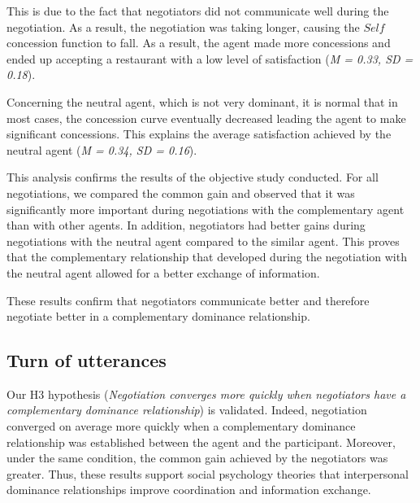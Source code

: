 \documentclass[10pt, a4paper]{article} %
\begin{document}
%	

This is due to the fact that negotiators did not communicate well during the negotiation. As a result, the negotiation was taking longer, causing the $Self$ concession function to fall. As a result, the agent made more concessions and ended up accepting a restaurant with a low level of satisfaction (\emph{M = 0.33, SD = 0.18}).

Concerning the neutral agent, which is not very dominant, it is normal that in most cases, the concession curve eventually decreased leading the agent to make significant concessions. This explains the average satisfaction achieved by the neutral agent (\emph{M = 0.34, SD = 0.16}).

This analysis confirms the results of the objective study conducted.
For all negotiations, we compared the common gain and observed that it was significantly more important during negotiations with the complementary agent than with other agents. In addition, negotiators had better gains during negotiations with the neutral agent compared to the similar agent. This proves that the complementary relationship that developed during the negotiation with the neutral agent allowed for a better exchange of information. 

These results confirm that negotiators communicate better and therefore negotiate better in a complementary dominance relationship.  


\subsection{Turn of utterances}
Our H3 hypothesis (\textit{Negotiation converges more quickly when negotiators have a complementary dominance relationship}) is validated. Indeed, negotiation converged on average more quickly when a complementary dominance relationship was established between the agent and the participant. Moreover, under the same condition, the common gain achieved by the negotiators was greater. Thus, these results support social psychology theories that interpersonal dominance relationships improve coordination and information exchange.
\end{document}
